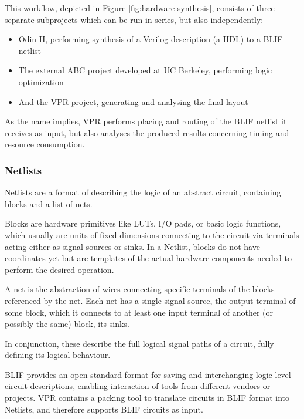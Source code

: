 This workflow, depicted in Figure \ref{fig:hardware-synthesis}, consists of three separate subprojects which can be run in series, but also independently: 

\begin{itemize}
	\item Odin II, performing synthesis of a Verilog description (a \gls{HDL}) to a \gls{BLIF} netlist
	\item The external ABC project developed at UC Berkeley\cite{ABC-web}, performing logic optimization
	\item And the \gls{VPR} project\cite{vpr-paper}, generating and analysing the final layout
\end{itemize}

As the name implies, \gls{VPR} performs placing and routing of the \gls{BLIF} netlist it receives as input, but also analyses the produced results concerning timing and resource consumption.

\subsubsection{Netlists}

Netlists are a format of describing the logic of an abstract circuit, containing blocks and a list of nets.

Blocks are hardware primitives like \glspl{LUT}, \gls{I/O} pads, or basic logic functions, which usually are units of fixed dimensions connecting to the circuit via terminals acting either as signal sources or sinks. In a Netlist, blocks do not have coordinates yet but are templates of the actual hardware components needed to perform the desired operation.

A net is the abstraction of wires connecting specific terminals of the blocks referenced by the net. Each net has a single signal source, the output terminal of some block, which it connects to at least one input terminal of another (or possibly the same) block, its sinks.

In conjunction, these describe the full logical signal paths of a circuit, fully defining its logical behaviour.

\gls{BLIF} provides an open standard format for saving and interchanging logic-level circuit descriptions, enabling interaction of tools from different vendors or projects.\cite{blif-web} \gls{VPR} contains a packing tool to translate circuits in \gls{BLIF} format into Netlists, and therefore supports \gls{BLIF} circuits as input.

